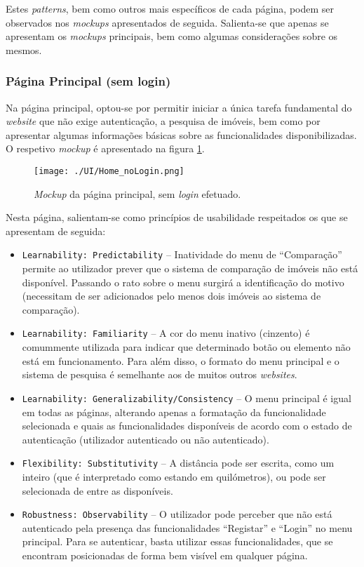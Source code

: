 Estes \textit{patterns}, bem como outros mais específicos de cada página, podem ser observados nos \textit{mockups} apresentados de seguida. Salienta-se que apenas se apresentam os \textit{mockups} principais, bem como algumas considerações sobre os mesmos.


\subsubsection{Página Principal (sem login)}
\label{sec:home_no_login}

Na página principal, optou-se por permitir iniciar a única tarefa fundamental do \textit{website} que não exige autenticação, a pesquisa de imóveis, bem como por apresentar algumas informações básicas sobre as funcionalidades disponibilizadas. O respetivo \textit{mockup} é apresentado na figura \ref{fig:home_no_login}.

\begin{figure}[H]
    \centering
    \texttt{[image: ./UI/Home\_noLogin.png]}
    \caption{\textit{Mockup} da página principal, sem \textit{login} efetuado.}
    \label{fig:home_no_login}
\end{figure}

Nesta página, salientam-se como princípios de usabilidade respeitados os que se apresentam de seguida:
\begin{itemize}
    \item \texttt{Learnability: Predictability} -- Inatividade do menu de ``Comparação'' permite ao utilizador prever que o sistema de comparação de imóveis não está disponível. Passando o rato sobre o menu surgirá a identificação do motivo (necessitam de ser adicionados pelo menos dois imóveis ao sistema de comparação).
    
    \item \texttt{Learnability: Familiarity} -- A cor do menu inativo (cinzento) é comummente utilizada para indicar que determinado botão ou elemento não está em funcionamento. Para além disso, o formato do menu principal e o sistema de pesquisa é semelhante aos de muitos outros \textit{websites}.
    
    \item \texttt{Learnability: Generalizability/Consistency} -- O menu principal é igual em todas as páginas, alterando apenas a formatação da funcionalidade selecionada e quais as funcionalidades disponíveis de acordo com o estado de autenticação (utilizador autenticado ou não autenticado).
    
    \item \texttt{Flexibility: Substitutivity} -- A distância pode ser escrita, como um inteiro (que é interpretado como estando em quilómetros), ou pode ser selecionada de entre as disponíveis.
    
    \item \texttt{Robustness: Observability} -- O utilizador pode perceber que não está autenticado pela presença das funcionalidades ``Registar'' e ``Login'' no menu principal. Para se autenticar, basta utilizar essas funcionalidades, que se encontram posicionadas de forma bem visível em qualquer página.
\end{itemize}

